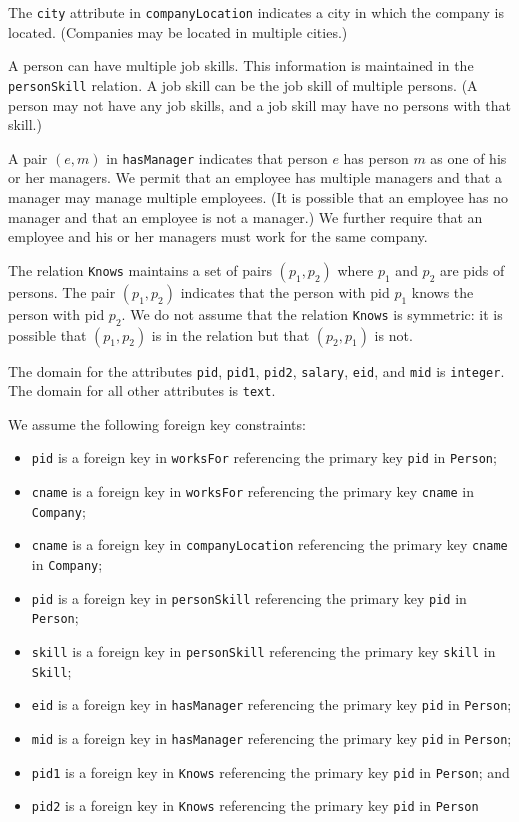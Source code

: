 \documentclass[10pt]{article}
\begin{document}
\begin{enumerate}[resume]
The {\tt city} attribute in {\tt companyLocation} indicates a city in which the company is located.
(Companies may be located in multiple cities.)

A person can have multiple job skills. This information is maintained in the {\tt personSkill} relation.  A job skill can be
the job skill of multiple persons.  (A person may not have any job skills, and a job skill may
have no persons with that skill.)

A pair $(e,m)$ in {\tt hasManager} indicates that person $e$ has  
person $m$ as one of his or her managers.
We permit that an employee has multiple managers and that a manager  may manage
multiple employees.  (It is possible that an employee has no manager
and that an employee is not a manager.)
We further require that 
an employee and his or her managers must work for the
same company.

The relation {\tt Knows} maintains a set of pairs $(p_1,p_2)$ where $p_1$ 
and $p_2$ are pids of persons.   The pair $(p_1,p_2)$ indicates that the person with
pid $p_1$ knows the person with pid $p_2$.
We do not assume that the relation {\tt Knows} is
symmetric: it is possible that $(p_1,p_2)$ is in the relation but that
$(p_2,p_1)$ is not.

The domain for the attributes {\tt pid}, {\tt pid1}, {\tt pid2}, {\tt salary}, {\tt eid}, and {\tt mid} is {\tt integer}.   The domain for all other attributes is {\tt text}.

We assume the following foreign key constraints:
\begin{itemize}
\item {\tt pid} is a foreign key in {\tt worksFor} referencing the primary key {\tt pid} in {\tt Person};
\item {\tt cname} is a foreign key in {\tt worksFor} referencing the primary key {\tt cname} in {\tt Company};
\item {\tt cname} is a foreign key in {\tt companyLocation} referencing the primary key {\tt cname} in {\tt Company};
\item {\tt pid} is a foreign key in {\tt personSkill} referencing the primary key {\tt pid} in {\tt Person};
\item {\tt skill} is a foreign key in {\tt personSkill} referencing the primary key {\tt skill} in {\tt Skill};
\item {\tt eid} is a foreign key in {\tt hasManager} referencing the primary key {\tt pid} in {\tt Person}; 
\item {\tt mid} is a foreign key in {\tt hasManager} referencing the primary key {\tt pid} in {\tt Person};
\item {\tt pid1} is a foreign key in {\tt Knows} referencing the primary key {\tt pid} in {\tt Person}; and
\item {\tt pid2} is a foreign key in {\tt Knows} referencing the primary key {\tt pid} in {\tt Person}
\end{itemize}



\end{enumerate}
\end{document}
